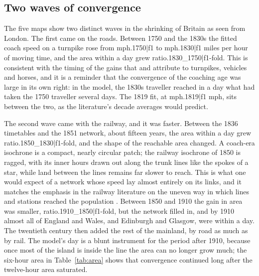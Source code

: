 \subsection{Two waves of convergence}
The five maps show two distinct waves in the shrinking of Britain as seen from London. The first came on the roads. Between 1750 and the 1830s the fitted coach speed on a turnpike rose from {{mph.1750|f1}} to {{mph.1830|f1}} miles per hour of moving time, and the area within a day grew {{ratio.1830_1750|f1}}-fold. This is consistent with the timing of the gains that \citet{gerhold2014} and \citet{bogart2005} attribute to turnpikes, vehicles and horses, and it is a reminder that the convergence of the coaching age was large in its own right: in the model, the 1830s traveller reached in a day what had taken the 1750 traveller several days. The 1819 fit, at {{mph.1819|f1}} mph, sits between the two, as the literature's decade averages would predict.

The second wave came with the railway, and it was faster. Between the 1836 timetables and the 1851 network, about fifteen years, the area within a day grew {{ratio.1850_1830|f1}}-fold, and the shape of the reachable area changed. A coach-era isochrone is a compact, nearly circular patch; the railway isochrone of 1850 is ragged, with its inner hours drawn out along the trunk lines like the spokes of a star, while land between the lines remains far slower to reach. This is what one would expect of a network whose speed lay almost entirely on its links, and it matches the emphasis in the railway literature on the uneven way in which lines and stations reached the population \citep{gregory2010,bogart2022}. Between 1850 and 1910 the gain in area was smaller, {{ratio.1910_1850|f1}}-fold, but the network filled in, and by 1910 almost all of England and Wales, and Edinburgh and Glasgow, were within a day. The twentieth century then added the rest of the mainland, by road as much as by rail. The model's day is a blunt instrument for the period after 1910, because once most of the island is inside the line the area can no longer grow much; the six-hour area in Table~\ref{tab:area} shows that convergence continued long after the twelve-hour area saturated.

